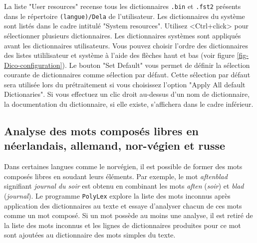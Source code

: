 \bigskip
\noindent La liste "User resources" recense tous les dictionnaires \verb+.bin+ et \verb+.fst2+
présents dans le répertoire \verb+(langue)/Dela+ de l’utilisateur. Les dictionnaires du système sont
listés dans le cadre intitulé "System resources". Utilisez <Ctrl+click> pour sélectionner plusieurs
dictionnaires. Les dictionnaires systèmes sont appliqués avant les dictionnaires utilisateurs.
Vous pouvez choisir l'ordre des dictionnaires des listes utililisateur et système à l'aide des
flèches haut et bas (voir figure \ref{fig-Dico-configuration}). Le bouton "Set Default" vous permet
de définir la sélection courante de dictionnaires comme sélection par défaut. Cette sélection par
défaut sera utilisée lors du prétraitement si vous choisissez l’option "Apply All default
Dictionaries".
Si vous effectuez un clic droit au-dessus d’un nom de dictionnaire, la documentation du
dictionnaire, si elle existe, s’affichera dans le cadre inférieur.


\subsection{Analyse des mots composés libres en néerlandais, allemand, nor-végien et russe}





\label{section-Norwegian-compound-words}
Dans certaines langues comme le norvégien, il est possible de former des mots composés
libres en soudant leurs éléments. Par exemple, le mot \textit{aftenblad} signifiant \textit{journal
du soir} est obtenu en combinant les mots \textit{aften} (\textit{soir}) et \textit{blad}
(\textit{journal}). Le programme \verb+PolyLex+  explore la liste des mots inconnus après application des dictionnaires au
texte et essaye d’analyser chacun de ces mots comme un mot composé. Si un mot possède au moins une
analyse, il est retiré de la liste des mots inconnus et les lignes de dictionnaires produites pour
ce mot sont ajoutées au dictionnaire des mots simples du texte.

